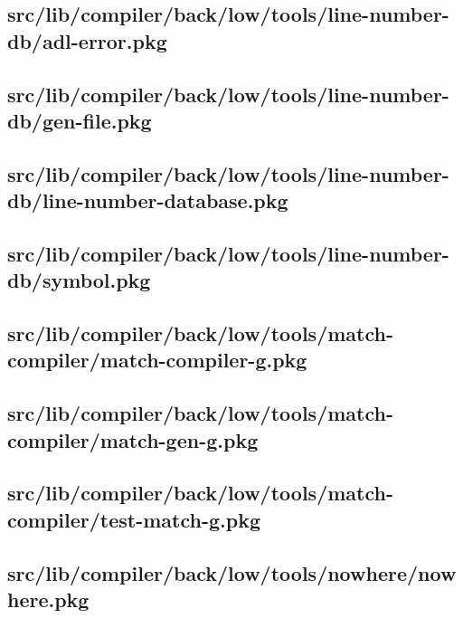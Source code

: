 \subsection{src/lib/compiler/back/low/tools/line-number-db/adl-error.pkg}


\subsection{src/lib/compiler/back/low/tools/line-number-db/gen-file.pkg}


\subsection{src/lib/compiler/back/low/tools/line-number-db/line-number-database.pkg}


\subsection{src/lib/compiler/back/low/tools/line-number-db/symbol.pkg}


\subsection{src/lib/compiler/back/low/tools/match-compiler/match-compiler-g.pkg}


\subsection{src/lib/compiler/back/low/tools/match-compiler/match-gen-g.pkg}


\subsection{src/lib/compiler/back/low/tools/match-compiler/test-match-g.pkg}


\subsection{src/lib/compiler/back/low/tools/nowhere/nowhere.pkg}


